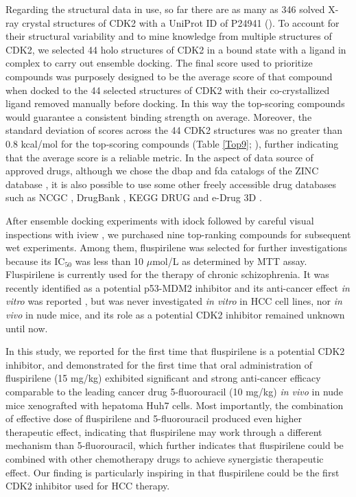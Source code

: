 \documentclass[10pt,letterpaper]{article}
\begin{document}
Regarding the structural data in use, so far there are as many as 346 solved X-ray crystal structures of CDK2 with a UniProt ID of P24941 (). To account for their structural variability and to mine knowledge from multiple structures of CDK2, we selected 44 holo structures of CDK2 in a bound state with a ligand in complex to carry out ensemble docking. The final score used to prioritize compounds was purposely designed to be the average score of that compound when docked to the 44 selected structures of CDK2 with their co-crystallized ligand removed manually before docking. In this way the top-scoring compounds would guarantee a consistent binding strength on average. Moreover, the standard deviation of scores across the 44 CDK2 structures was no greater than 0.8 kcal/mol for the top-scoring compounds (Table \ref{Top9}; ), further indicating that the average score is a reliable metric. In the aspect of data source of approved drugs, although we chose the dbap and fda catalogs of the ZINC database \cite{532,1178}, it is also possible to use some other freely accessible drug databases such as NCGC \cite{1608}, DrugBank \cite{1594}, KEGG DRUG \cite{1595} and e-Drug 3D \cite{1125}.

After ensemble docking experiments with idock \cite{1153,1362} followed by careful visual inspections with iview \cite{1366}, we purchased nine top-ranking compounds for subsequent wet experiments. Among them, fluspirilene was selected for further investigations because its IC$_{50}$ was less than 10 $\mu$mol/L as determined by MTT assay. Fluspirilene is currently used for the therapy of chronic schizophrenia. It was recently identified as a potential p53-MDM2 inhibitor and its anti-cancer effect \textit{in vitro} was reported \cite{1606}, but was never investigated \textit{in vitro} in HCC cell lines, nor \textit{in vivo} in nude mice, and its role as a potential CDK2 inhibitor remained unknown until now.

In this study, we reported for the first time that fluspirilene is a potential CDK2 inhibitor, and demonstrated for the first time that oral administration of fluspirilene (15 mg/kg) exhibited significant and strong anti-cancer efficacy comparable to the leading cancer drug 5-fluorouracil (10 mg/kg) \textit{in vivo} in nude mice xenografted with hepatoma Huh7 cells. Most importantly, the combination of effective dose of fluspirilene and 5-fluorouracil produced even higher therapeutic effect, indicating that fluspirilene may work through a different mechanism than 5-fluorouracil, which further indicates that fluspirilene could be combined with other chemotherapy drugs to achieve synergistic therapeutic effect. Our finding is particularly inspiring in that fluspirilene could be the first CDK2 inhibitor used for HCC therapy.
\end{document}
